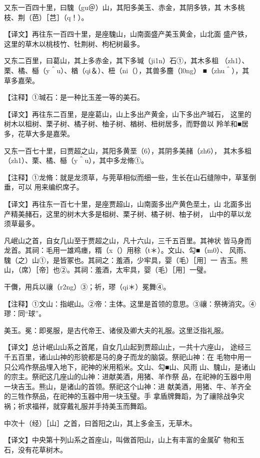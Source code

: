 \documentclass[a4paper,12pt,UTF8,twoside]{ctexbook}
\begin{document}
又东一百四十里，曰騩（gu＠）山，其阳多美玉、赤金，其阴多铁，其 木多桃枝、荆（芭）［芑］（q！）。

【译文】再往东一百四十里，是座騩山，山南面盛产美玉黄金，山北面 盛产铁，这里的草木以桃枝竹、牡荆树、枸杞树最多。

又东二百里，曰葛山，其上多赤金，其下多瑊（ji1n）石①，其木多柤 （zh1）、栗、橘、櫾（y＾u）、楢（qi＆）、杻（ni（），其兽多麢（l0ng） ■（zhu＾），其草多嘉荣。

【注释】①瑊石：是一种比玉差一等的美石。

【译文】再往东二百里，是座葛山，山上多出产黄金，山下多出产瑊石， 这里的树木以柤树、栗子树、橘子树、柚子树、楢树、杻树居多，而野兽以 羚羊和■居多，花草大多是嘉荣。

又东一百七十里，曰贾超之山，其阳多黄垩（6），其阴多美赭（zh6）， 其木多柤（zh1）、栗、橘、櫾（y＾u），其中多龙脩①。

【注释】①龙脩：就是龙须草，与莞草相似而细一些，生长在山石缝隙中，草茎倒垂，可以 用来编织席子。

【译文】再往东一百七十里，是座贾超山，山南面多出产黄色垩土，山 北面多出产精美赭石，这里的树木大多是柤树、栗子树、橘子树、柚子树， 山中的草以龙须草最多。

凡岷山之首，自女几山至于贾超之山，凡十六山，三千五百里。其神状 皆马身而龙首。其祠：毛用一雄鸡瘗，糈（x（）用稌（t＊）。文山、勾■（m0）、 风雨、騩（之）山①，是皆冢也。其祠之：羞酒，少牢具，婴（毛）［用］一 吉玉。熊山，（席）［帝］也②。其祠：羞酒，太牢具，婴（毛）［用］一璧。

干儛，用兵以禳（r2ng）③；祈，璆（qi＊）冕舞④。

【注释】①文山：指岷山。②帝：主体。这里是首领的意思。③禳：祭祷消灾。④璆：同“球”。

美玉。冕：即冕服，是古代帝王、诸侯及卿大夫的礼服。这里泛指礼服。

【译文】总计岷山山系之首尾，自女几山起到贾超山止，一共十六座山， 途经三千五百里，诸山山神的形貌都是马的身子而龙的脑袋。祭祀山神：在 毛物中用一只公鸡作祭品埋入地下，祀神的米用稻米。文山、勾■山、风雨 山、騩山，是诸山的宗主。祭祀这几座山的山神：进献美酒，用猪、羊作祭 品，在祀神的玉器中用一块吉玉。熊山，是诸山的首领。祭祀这个山神：进 献美酒，用猪、牛、羊齐全的三牲作祭品，在祀神的玉器中用一块玉璧。手 拿盾牌舞蹈，为了禳除战争灾祸；祈求福祥，就穿戴礼服并手持美玉而舞蹈。

中次十（经）［山］之首，曰首阳之山，其上多金玉，无草木。

【译文】中央第十列山系之首座山，叫做首阳山，山上有丰富的金属矿 物和玉石，没有花草树木。
\end{document}
